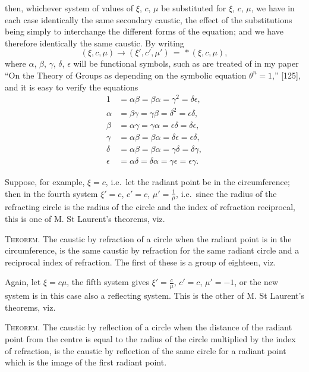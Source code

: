 \documentclass[11pt,a4paper]{article}
\theoremstyle{definition}
\begin{document}
then, whichever system of values of $\xi$, $c$, $\mu$ be substituted for $\xi$, $c$, $\mu$, we have in
each case identically the same secondary caustic, the effect of the substitutions being
simply to interchange the different forms of the equation; and we have therefore
identically the same caustic. By writing
\[
(\xi, c, \mu) \to (\xi', c', \mu')
\,=\, * (\xi, c, \mu),
\]
where $\alpha$, $\beta$, $\gamma$, $\delta$, $\epsilon$ will be functional symbols, such as are treated of in my paper ``On the
Theory of Groups as depending on the symbolic equation $\theta^n=1$,'' [125], and it is
easy to verify the equations
\begin{align*}
1 &= \alpha\beta = \beta\alpha = \gamma^2 = \delta\epsilon, \\
\alpha &= \beta\gamma = \gamma\beta = \delta^2 = \epsilon\delta, \\
\beta &= \alpha\gamma = \gamma\alpha = \epsilon\delta = \delta\epsilon, \\
\gamma &= \alpha\beta = \beta\alpha = \delta\epsilon = \epsilon\delta, \\
\delta &= \alpha\beta = \beta\alpha = \gamma\delta = \delta\gamma, \\
\epsilon &= \alpha\delta = \delta\alpha = \gamma\epsilon = \epsilon\gamma.
\end{align*}

\medskip

Suppose, for example, $\xi = c$, i.e.\ let the radiant point be in the circumference; then in the fourth system $\xi' = c$, $c' = c$, $\mu' = \tfrac{1}{\mu}$, i.e.\ since the radius of the refracting circle is the radius of the circle and the index of refraction reciprocal, this is one of M. St Laurent's theorems, viz.

\smallskip

\textsc{Theorem.} The caustic by refraction of a circle when the radiant point is in the circumference, is the same caustic by refraction for the same radiant circle and a reciprocal index of refraction. The first of these is a group of eighteen, viz.\

\smallskip

Again, let $\xi = c\mu$, the fifth system gives $\xi' = \tfrac{c}{\mu}$, $c' = c$, $\mu' = -1$, or the new system
is in this case also a reflecting system. This is the other of M. St Laurent's
theorems, viz.

\smallskip

\textsc{Theorem.} The caustic by reflection of a circle when the distance of the radiant
point from the centre is equal to the radius of the circle multiplied by the index of
refraction, is the caustic by reflection of the same circle for a radiant point which is
the image of the first radiant point.
\end{document}

